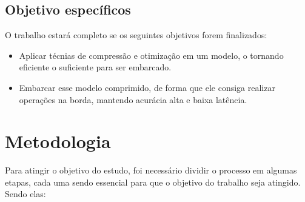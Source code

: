 \subsection{Objetivo específicos}
O trabalho estará completo se os seguintes objetivos forem finalizados:

\begin{itemize}
	\item Aplicar técnias de compressão e otimização em um modelo, o tornando eficiente o suficiente para ser
		embarcado.
	\item Embarcar esse modelo comprimido, de forma que ele consiga realizar operações na borda, mantendo acurácia
		alta e baixa latência.
\end{itemize}

\section{Metodologia}
Para atingir o objetivo do estudo, foi necessário dividir o processo em algumas etapas, cada uma sendo
essencial para que o objetivo do trabalho seja atingido. Sendo elas:

